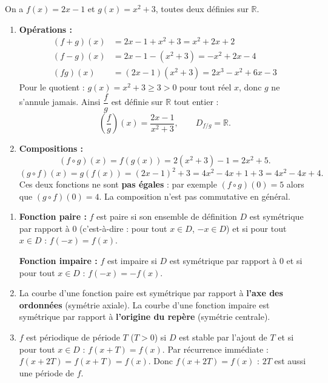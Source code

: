 \documentclass[11pt]{article}
\newcommand{\cle}[1]{{\popxbold\color{popdark}#1}}
\begin{document}
\begin{corrige}
On a $f(x)=2x-1$ et $g(x)=x^2+3$, toutes deux définies sur $\mathbb{R}$.
\begin{enumerate}
    \item \textbf{Opérations :}
    \begin{align*}
    (f+g)(x) &= 2x-1+x^2+3 = x^2+2x+2 \\
    (f-g)(x) &= 2x-1-(x^2+3) = -x^2+2x-4 \\
    (fg)(x) &= (2x-1)(x^2+3) = 2x^3-x^2+6x-3
    \end{align*}
    Pour le quotient : $g(x)=x^2+3 \geqslant 3 > 0$ pour tout réel $x$, donc $g$ ne s'annule jamais. Ainsi $\dfrac{f}{g}$ est définie sur $\mathbb{R}$ tout entier :
    \[ \left(\frac{f}{g}\right)(x) = \frac{2x-1}{x^2+3}, \qquad D_{f/g}=\mathbb{R}. \]
    \item \textbf{Compositions :}
    \[ (f \circ g)(x) = f(g(x)) = 2(x^2+3)-1 = 2x^2+5. \]
    \[ (g \circ f)(x) = g(f(x)) = (2x-1)^2+3 = 4x^2-4x+1+3 = 4x^2-4x+4. \]
    Ces deux fonctions ne sont \textbf{pas égales} : par exemple $(f\circ g)(0)=5$ alors que $(g\circ f)(0)=4$. La composition n'est pas commutative en général.
\end{enumerate}
\end{corrige}

\begin{corrige}
\begin{enumerate}
    \item \textbf{Fonction paire :} $f$ est paire si son ensemble de définition $D$ est symétrique par rapport à $0$ (c'est-à-dire : pour tout $x \in D$, $-x \in D$) et si pour tout $x \in D$ : $f(-x)=f(x)$.
    
    \textbf{Fonction impaire :} $f$ est impaire si $D$ est symétrique par rapport à $0$ et si pour tout $x \in D$ : $f(-x)=-f(x)$.
    \item La courbe d'une fonction \cle{paire} est symétrique par rapport à \textbf{l'axe des ordonnées} (symétrie axiale). La courbe d'une fonction \cle{impaire} est symétrique par rapport à \textbf{l'origine du repère} (symétrie centrale).
    \item $f$ est \cle{périodique} de période $T$ ($T>0$) si $D$ est stable par l'ajout de $T$ et si pour tout $x \in D$ : $f(x+T)=f(x)$. Par récurrence immédiate : $f(x+2T)=f(x+T)=f(x)$. Donc $f(x+2T)=f(x)$ : $2T$ est aussi une période de $f$.
\end{enumerate}
\end{corrige}
\end{document}

